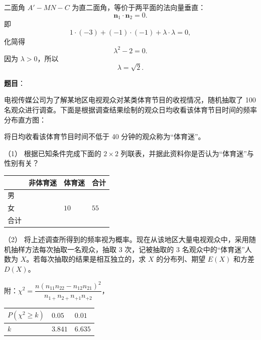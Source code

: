 \begin{answer}
二面角 $A'-MN-C$ 为直二面角，等价于两平面的法向量垂直：
\nopagebreak[4]
\[\boldsymbol n_1\cdot\boldsymbol n_2=0.\]
即
\nopagebreak[4]
\[1\cdot(-3)+(-1)\cdot(-1)+\lambda\cdot\lambda=0,\]
化简得
\nopagebreak[4]
\[\lambda^2-2=0.\]
因为 $\lambda>0$，所以
\nopagebreak[4]
\[\lambda=\sqrt2.\]



\end{answer}
\begin{answer}

\textbf{题目}：

电视传媒公司为了解某地区电视观众对某类体育节目的收视情况，随机抽取了 100 名观众进行调查。下面是根据调查结果绘制的观众日均收看该体育节目时间的频率分布直方图：
\nopagebreak[4]
\begin{center}\end{center}
\nopagebreak[4]
将日均收看该体育节目时间不低于 40 分钟的观众称为“体育迷”。

（1） 根据已知条件完成下面的 $2\times2$ 列联表，并据此资料你是否认为“体育迷”与性别有关？

\begin{center}
\begin{tabular}{llll}
\toprule
 & 非体育迷 & 体育迷 & 合计 \\
\midrule
男 &  &  &  \\
女 &  & $10$ & $55$ \\
合计 &  &  &  \\
\bottomrule
\end{tabular}
\end{center}

（2） 将上述调查所得到的频率视为概率。现在从该地区大量电视观众中，采用随机抽样方法每次抽取一名观众，抽取 3 次，记被抽取的 3 名观众中的“体育迷”人数为 $X$。若每次抽取的结果是相互独立的，求 $X$ 的分布列、期望 $E(X)$ 和方差 $D(X)$。

附：$\chi^2=\dfrac{n(n_{11}n_{22}-n_{12}n_{21})^2}{n_{1+}n_{2+}n_{+1}n_{+2}}$，

\begin{center}
\begin{tabular}{lll}
\toprule
$P(\chi^2\geqslant k)$ & $0.05$ & $0.01$ \\
\midrule
$k$ & $3.841$ & $6.635$ \\
\bottomrule
\end{tabular}
\end{center}


\end{answer}
